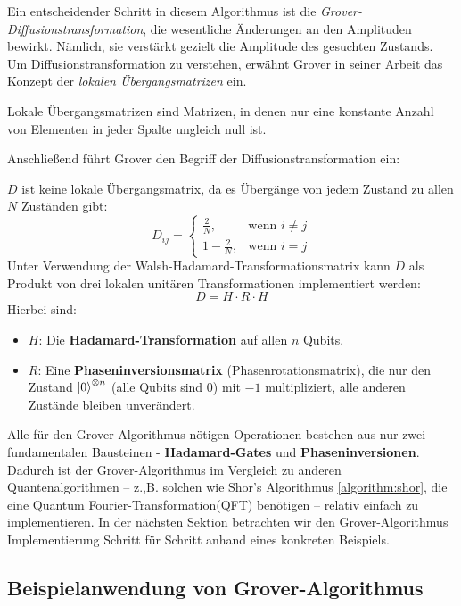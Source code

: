 Ein entscheidender Schritt in diesem Algorithmus ist die \textit{Grover-Diffusionstransformation}, die wesentliche Änderungen an den Amplituden bewirkt. Nämlich, sie verstärkt gezielt die Amplitude des gesuchten Zustands. Um Diffusionstransformation zu verstehen, erwähnt Grover in seiner Arbeit das Konzept der \textit{lokalen Übergangsmatrizen} ein.

\begin{definition}
Lokale Übergangsmatrizen sind Matrizen, in denen nur eine konstante Anzahl von Elementen in jeder Spalte ungleich null ist.
\end{definition}

Anschließend führt Grover den Begriff der Diffusionstransformation ein:

\begin{definition}
\( D \) ist keine lokale Übergangsmatrix, da es Übergänge von jedem Zustand zu allen \( N \) Zuständen gibt:
$$
D_{ij} = 
\begin{cases}
\frac{2}{N}, & \text{wenn } i \ne j \\
1 - \frac{2}{N}, & \text{wenn } i = j
\end{cases}
$$
Unter Verwendung der Walsh-Hadamard-Transformationsmatrix kann \( D \) als Produkt von drei lokalen unitären Transformationen implementiert werden:
$$
D = H \cdot R \cdot H
$$
Hierbei sind:
\begin{itemize}
\item $H$: Die \textbf{Hadamard-Transformation} auf allen $n$ Qubits.
\item $R$: Eine \textbf{Phaseninversionsmatrix} (Phasenrotationsmatrix), die nur den Zustand $\ket{0}^{\otimes n}$ (alle Qubits sind 0) mit $-1$ multipliziert, alle anderen Zustände bleiben unverändert.
\end{itemize}
\end{definition}

Alle für den Grover-Algorithmus nötigen Operationen bestehen aus nur zwei fundamentalen Bausteinen - \textbf{Hadamard-Gates} und \textbf{Phaseninversionen}. Dadurch ist der Grover-Algorithmus im Vergleich zu anderen Quantenalgorithmen – z.,B. solchen wie Shor's Algorithmus \ref{algorithm:shor}, die eine Quantum Fourier-Transformation(QFT) benötigen – relativ einfach zu implementieren. In der nächsten Sektion betrachten wir den Grover-Algorithmus Implementierung Schritt für Schritt anhand eines konkreten Beispiels.

\subsection{Beispielanwendung von Grover-Algorithmus}

